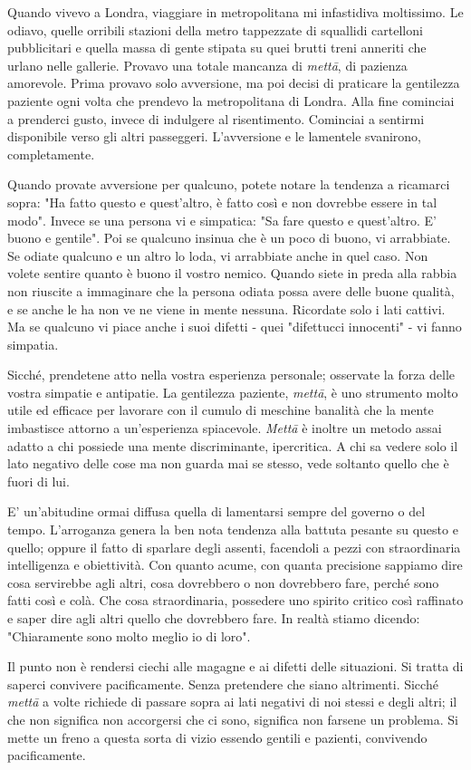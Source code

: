 Quando vivevo a Londra, viaggiare in metropolitana mi infastidiva
moltissimo. Le odiavo, quelle orribili stazioni della metro tappezzate
di squallidi cartelloni pubblicitari e quella massa di gente stipata su
quei brutti treni anneriti che urlano nelle gallerie. Provavo una totale
mancanza di \textit{mettā}, di pazienza amorevole. Prima provavo solo avversione,
ma poi decisi di praticare la gentilezza paziente ogni volta che
prendevo la metropolitana di Londra. Alla fine cominciai a prenderci
gusto, invece di indulgere al risentimento. Cominciai a sentirmi
disponibile verso gli altri passeggeri. L'avversione e le lamentele
svanirono, completamente.

Quando provate avversione per qualcuno, potete notare la tendenza a
ricamarci sopra: "Ha fatto questo e quest'altro, è fatto così e non
dovrebbe essere in tal modo". Invece se una persona vi e simpatica: "Sa
fare questo e quest'altro. E' buono e gentile". Poi se qualcuno insinua
che è un poco di buono, vi arrabbiate. Se odiate qualcuno e un altro lo
loda, vi arrabbiate anche in quel caso. Non volete sentire quanto è
buono il vostro nemico. Quando siete in preda alla rabbia non riuscite a
immaginare che la persona odiata possa avere delle buone qualità, e se
anche le ha non ve ne viene in mente nessuna. Ricordate solo i lati
cattivi. Ma se qualcuno vi piace anche i suoi difetti - quei "difettucci
innocenti" - vi fanno simpatia.

Sicché, prendetene atto nella vostra esperienza personale; osservate la
forza delle vostra simpatie e antipatie. La gentilezza paziente, \textit{mettā},
è uno strumento molto utile ed efficace per lavorare con il cumulo di
meschine banalità che la mente imbastisce attorno a un'esperienza
spiacevole. \textit{Mettā} è inoltre un metodo assai adatto a chi possiede una
mente discriminante, ipercritica. A chi sa vedere solo il lato negativo
delle cose ma non guarda mai se stesso, vede soltanto quello che è fuori
di lui.

E' un'abitudine ormai diffusa quella di lamentarsi sempre del governo o
del tempo. L'arroganza genera la ben nota tendenza alla battuta pesante
su questo e quello; oppure il fatto di sparlare degli assenti, facendoli
a pezzi con straordinaria intelligenza e obiettività. Con quanto acume,
con quanta precisione sappiamo dire cosa servirebbe agli altri, cosa
dovrebbero o non dovrebbero fare, perché sono fatti così e colà. Che
cosa straordinaria, possedere uno spirito critico così raffinato e saper
dire agli altri quello che dovrebbero fare. In realtà stiamo dicendo:
"Chiaramente sono molto meglio io di loro".

Il punto non è rendersi ciechi alle magagne e ai difetti delle
situazioni. Si tratta di saperci convivere pacificamente. Senza
pretendere che siano altrimenti. Sicché \textit{mettā} a volte richiede di
passare sopra ai lati negativi di noi stessi e degli altri; il che non
significa non accorgersi che ci sono, significa non farsene un problema.
Si mette un freno a questa sorta di vizio essendo gentili e pazienti,
convivendo pacificamente.

